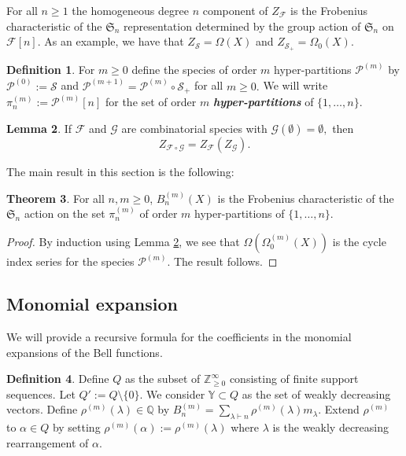 \documentclass[12pt,reqno]{amsart}
\theoremstyle{definition}
\newtheorem{thm}{Theorem}[section]
\newtheorem{lem}[thm]{Lemma}
\newtheorem{defn}[thm]{Definition}
\begin{document}
For all $n \geq 1$ the homogeneous degree $n$ component of $Z_{\mathcal{F}}$ is the Frobenius characteristic of the $\mathfrak{S}_n$ representation determined by the group action of $\mathfrak{S}_n$ on $\mathcal{F}[n].$ As an example, we have that $Z_{\mathcal{S}} = \Omega(X)$ and $Z_{\mathcal{S}_+} = \Omega_0(X).$

\begin{defn}
    For $m \geq 0$ define the species of order $m$ hyper-partitions $\mathcal{P}^{(m)}$ by $\mathcal{P}^{(0)}:= \mathcal{S}$ and $\mathcal{P}^{(m+1)} = \mathcal{P}^{(m)}\circ \mathcal{S}_{+}$ for all $m \geq 0.$ We will write $\pi^{(m)}_n:= \mathcal{P}^{(m)}[n]$ for the set of order $m$ \textit{\textbf{hyper-partitions}} of $\{1,\ldots,n\}.$
\end{defn}

\begin{lem}\cite{BLL98}\label{species comp lem}
    If $\mathcal{F}$ and $\mathcal{G}$ are combinatorial species with $\mathcal{G}(\emptyset) = \emptyset,$ then 
    $$Z_{\mathcal{F} \circ \mathcal{G}} = Z_\mathcal{F}(Z_\mathcal{G}).$$
\end{lem}

The main result in this section is the following:

\begin{thm}\label{Frob thm}
    For all $n,m \geq 0$, $B_n^{(m)}(X)$ is the Frobenius characteristic of the $\mathfrak{S}_n$ action on the set $\pi_n^{(m)}$ of order $m$ hyper-partitions of $\{1,\ldots, n\}.$
\end{thm}
\begin{proof}
    By induction using Lemma \ref{species comp lem}, we see that $\Omega( \Omega^{(m)}_0(X))$ is the cycle index series for the species $\mathcal{P}^{(m)}$. The result follows.
\end{proof}



\subsection{Monomial expansion}

We will provide a recursive formula for the coefficients in the monomial expansions of the Bell functions. 

\begin{defn}
    Define $Q$ as the subset of $\mathbb{Z}_{\geq 0}^{\infty}$ consisting of finite support sequences. Let $Q' := Q \setminus \{0\}.$ We consider $\mathbb{Y} \subset Q$ as the set of weakly decreasing vectors. Define $\rho^{(m)}(\lambda) \in \mathbb{Q}$ by
    $B^{(m)}_n = \sum_{\lambda \vdash n} \rho^{(m)}(\lambda) m_{\lambda}.$ Extend $\rho^{(m)}$ to $\alpha \in Q$ by setting $\rho^{(m)}(\alpha):= \rho^{(m)}(\lambda)$ where $\lambda$ is the weakly decreasing rearrangement of $\alpha.$
\end{defn}
\end{document}
